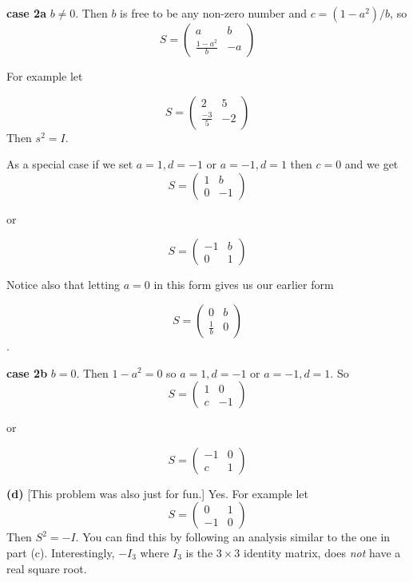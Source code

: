 \documentclass[oneside,12pt]{amsart}
\begin{document}
\smallskip

\textbf{case 2a} $b\not=0$.
Then $b$ is free to be any non-zero number and
$c=(1-a^2)/b$, so
$$
S=
\begin{pmatrix}
a & b \\
\frac{1-a^2}{b} & -a
\end{pmatrix}
$$

For example let

$$
S=
\begin{pmatrix}
2 & 5 \\
\frac{-3}{5} & -2
\end{pmatrix}
$$
Then $s^2=I$.

As a special case if we set $a=1,d=-1$ or $a=-1,d=1$ then $c=0$
and we get
$$
S=
\begin{pmatrix}
1 & b\\
0 & -1
\end{pmatrix}
$$

or

$$
S=
\begin{pmatrix}
-1 & b\\
0 & 1
\end{pmatrix}
$$

Notice also that letting $a=0$ in this form gives us our earlier form

$$
S=
\begin{pmatrix}
0 & b \\
\frac{1}{b} & 0
\end{pmatrix}
$$.

\smallskip

\textbf{case 2b} $b=0$.
Then
$1 - a^2 = 0$ so $a=1,d=-1$ or $a=-1,d=1$. So
$$
S=
\begin{pmatrix}
1 & 0\\
c & -1
\end{pmatrix}
$$

or

$$
S=
\begin{pmatrix}
-1 & 0\\
c & 1
\end{pmatrix}
$$

\smallskip

\textbf{(d)} [This problem was also just for fun.] Yes. For example let
$$
S =
\begin{pmatrix}
0  & 1 \\
-1 & 0
\end{pmatrix}
$$
Then $S^2 = -I$. You can find this by following an analysis similar to the one in
part (c). Interestingly, $-I_3$ where $I_3$ is the $3\times3$ identity matrix,
does \emph{not} have a real square root.
\end{document}
